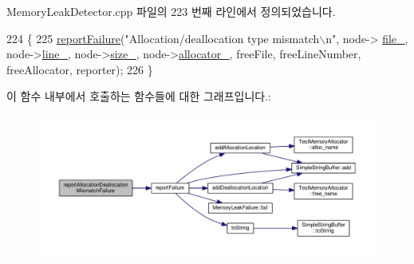 Memory\+Leak\+Detector.\+cpp 파일의 223 번째 라인에서 정의되었습니다.


\begin{DoxyCode}
224 \{
225     \hyperlink{class_memory_leak_output_string_buffer_ae3d2ba0fc07468c3ac05c87be80caf55}{reportFailure}(\textcolor{stringliteral}{"Allocation/deallocation type mismatch\(\backslash\)n"}, node->
      \hyperlink{struct_memory_leak_detector_node_a1f340748cdde8f8781fa62b4a3562190}{file\_}, node->\hyperlink{struct_memory_leak_detector_node_ac515e5f5602db49593f96316f1b5c054}{line\_}, node->\hyperlink{struct_memory_leak_detector_node_a5f31775800bbb46b35b5791def1f3acc}{size\_}, node->\hyperlink{struct_memory_leak_detector_node_a12122107c5adfce5f08568d080ad411a}{allocator\_}, freeFile, freeLineNumber, 
      freeAllocator, reporter);
226 \}
\end{DoxyCode}


이 함수 내부에서 호출하는 함수들에 대한 그래프입니다.\+:
\nopagebreak
\begin{figure}[H]
\begin{center}
\leavevmode
\includegraphics[width=350pt]{class_memory_leak_output_string_buffer_a94baa48406f230991c764abd1cf3a904_cgraph}
\end{center}
\end{figure}


